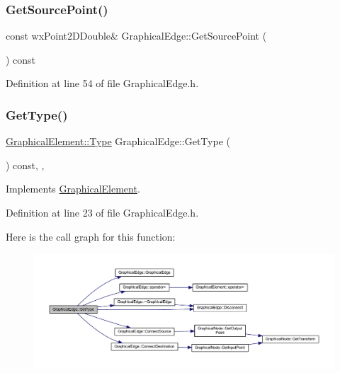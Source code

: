 \subsubsection{\texorpdfstring{Get\+Source\+Point()}{GetSourcePoint()}}
{\footnotesize\ttfamily const wx\+Point2\+D\+Double\& Graphical\+Edge\+::\+Get\+Source\+Point (\begin{DoxyParamCaption}{ }\end{DoxyParamCaption}) const\hspace{0.3cm}{\ttfamily [inline]}}



Definition at line 54 of file Graphical\+Edge.\+h.

\mbox{\label{class_graphical_edge_ad2db5ea6f28e2e572583909ff1f68088}} 
\subsubsection{\texorpdfstring{Get\+Type()}{GetType()}}
{\footnotesize\ttfamily \hyperlink{class_graphical_element_aa485be48b901d85de97b3bd86f381d9e}{Graphical\+Element\+::\+Type} Graphical\+Edge\+::\+Get\+Type (\begin{DoxyParamCaption}{ }\end{DoxyParamCaption}) const\hspace{0.3cm}{\ttfamily [inline]}, {\ttfamily [override]}, {\ttfamily [virtual]}}



Implements \hyperlink{class_graphical_element_a28c3cdbdfa3f295f6afaf463ba3e6157}{Graphical\+Element}.



Definition at line 23 of file Graphical\+Edge.\+h.

Here is the call graph for this function\+:
\nopagebreak
\begin{figure}[H]
\begin{center}
\leavevmode
\includegraphics[width=350pt]{class_graphical_edge_ad2db5ea6f28e2e572583909ff1f68088_cgraph}
\end{center}
\end{figure}
\mbox{\label{class_graphical_edge_ad590b20ea1c1cb30a15850a36f82a2c9}} 
